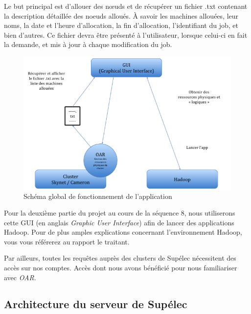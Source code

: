 \par Le but principal est d’allouer des nœuds et de récupérer un fichier .txt contenant la description détaillée des noeuds alloués. À savoir les machines allouées, leur noms, la date et l'heure d'allocation, la fin d'allocation, l'identifiant du job, et bien d'autres. Ce fichier devra être présenté à l'utilisateur, lorsque celui-ci en fait la demande, et mis à jour à chaque modification du job.
\begin{figure}[h!]
  \centering
  \includegraphics[width=14cm]{images/schema_global.png}
  \caption{Schéma global de fonctionnement de l'application}
  \label{fig:schema_global}
\end{figure}

\par Pour la deuxième partie du projet au cours de la séquence 8, nous utiliserons cette GUI (en anglais \emph{Graphic User Interface}) afin de lancer des applications Hadoop. Pour de plus amples explications concernant l'environnement Hadoop, vous vous référerez au rapport le traitant.
\par Par ailleurs, toutes les requêtes auprès des clusters de Supélec nécessitent des accès sur nos comptes. Accès dont nous avons bénéficié pour nous familiariser avec \emph{OAR}.

\subsection{Architecture du serveur de Supélec}
\label{sec:archi-serveur-supelec}

